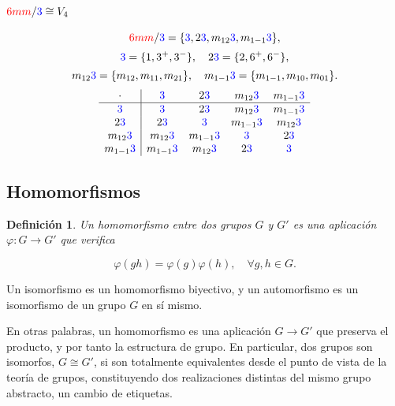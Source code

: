 \documentclass{report}
\newtheorem{definition}{Definición}
\begin{document}
\begin{multicols}{2}
\subsection*{\( \textcolor{red}{6mm} / \textcolor{blue}{3} \cong V_4 \)}
\[
\textcolor{red}{6mm} / \textcolor{blue}{3} = \{ \textcolor{blue}{3}, 2\textcolor{blue}{3}, m_{12}\textcolor{blue}{3}, m_{1-1}\textcolor{blue}{3} \},
\]
\[
\textcolor{blue}{3} = \{1, 3^+, 3^-\}, \quad 2\textcolor{blue}{3} = \{2, 6^+, 6^-\},
\]
\[
 m_{12}\textcolor{blue}{3} = \{m_{12}, m_{11}, m_{21}\}, \quad m_{1-1}\textcolor{blue}{3} = \{m_{1-1}, m_{10}, m_{01}\}.
\]
\columnbreak
\[
\begin{array}{c|cccc}
\cdot & \textcolor{blue}{3} & 2\textcolor{blue}{3} & m_{12}\textcolor{blue}{3} & m_{1-1}\textcolor{blue}{3}\\ \hline
\textcolor{blue}{3} & \textcolor{blue}{3} & 2\textcolor{blue}{3} & m_{12}\textcolor{blue}{3} & m_{1-1}\textcolor{blue}{3}\\
2\textcolor{blue}{3} & 2\textcolor{blue}{3} & \textcolor{blue}{3} & m_{1-1}\textcolor{blue}{3} & m_{12}\textcolor{blue}{3}\\
m_{12}\textcolor{blue}{3} & m_{12}\textcolor{blue}{3} & m_{1-1}\textcolor{blue}{3} & \textcolor{blue}{3} & 2\textcolor{blue}{3}\\
m_{1-1}\textcolor{blue}{3} & m_{1-1}\textcolor{blue}{3} & m_{12}\textcolor{blue}{3} & 2\textcolor{blue}{3} & \textcolor{blue}{3}
\end{array}
\]
\end{multicols}


\vspace{1cm}
\subsection{Homomorfismos}
\begin{definition}
 Un homomorfismo entre dos grupos \( G \) y \( G' \) es una aplicación \( \varphi: G \to G' \) que verifica

\[
\varphi(gh) = \varphi(g) \varphi(h), \quad \forall g,h \in G.
\]
\end{definition}
 Un isomorfismo es un homomorfismo biyectivo, y un automorfismo es un isomorfismo de un grupo \( G \) en sí mismo.

En otras palabras, un homomorfismo es una aplicación \( G \to G' \) que preserva el producto, y por tanto la estructura de grupo. En particular, dos grupos son isomorfos, $G \cong G'$, si son totalmente equivalentes desde el punto de vista de la teoría de grupos, constituyendo dos realizaciones distintas del mismo grupo abstracto, un cambio de etiquetas.\\
\end{document}
